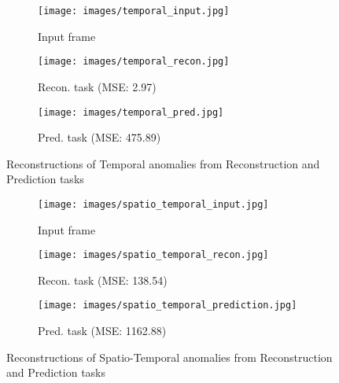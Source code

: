 \begin{itemize}
    \begin{figure}[h]
     \centering
     \begin{subfigure}[b]{0.3\textwidth}
         \centering
         \texttt{[image: images/temporal\_input.jpg]}
         \caption{Input frame}
         \label{fig:temp-ip}
     \end{subfigure}
     \hfill
     \begin{subfigure}[b]{0.3\textwidth}
         \centering
         \texttt{[image: images/temporal\_recon.jpg]}
         \caption{Recon. task (MSE: 2.97)}
         \label{fig:temp-recon}
     \end{subfigure}
     \hfill
     \begin{subfigure}[b]{0.3\textwidth}
         \centering
         \texttt{[image: images/temporal\_pred.jpg]}
         \caption{Pred. task (MSE: 475.89)}
         \label{fig:temp-pred}
     \end{subfigure}
        \caption{Reconstructions of Temporal anomalies from Reconstruction and Prediction tasks}
        \label{fig:temp}
    \end{figure}
    
    \begin{figure}[h]
     \centering
     \begin{subfigure}[b]{0.3\textwidth}
         \centering
         \texttt{[image: images/spatio\_temporal\_input.jpg]}
         \caption{Input frame}
         \label{fig:spat-temp-ip}
     \end{subfigure}
     \hfill
     \begin{subfigure}[b]{0.3\textwidth}
         \centering
         \texttt{[image: images/spatio\_temporal\_recon.jpg]}
         \caption{Recon. task (MSE: 138.54)}
         \label{fig:spat-temp-recon}
     \end{subfigure}
     \hfill
     \begin{subfigure}[b]{0.3\textwidth}
         \centering
         \texttt{[image: images/spatio\_temporal\_prediction.jpg]}
         \caption{Pred. task (MSE: 1162.88)}
         \label{fig:spat-temp-pred}
     \end{subfigure}
        \caption{Reconstructions of Spatio-Temporal anomalies from Reconstruction and Prediction tasks}
        \label{fig:spat-temp}
    \end{figure}

 
\end{itemize}
\newpage

